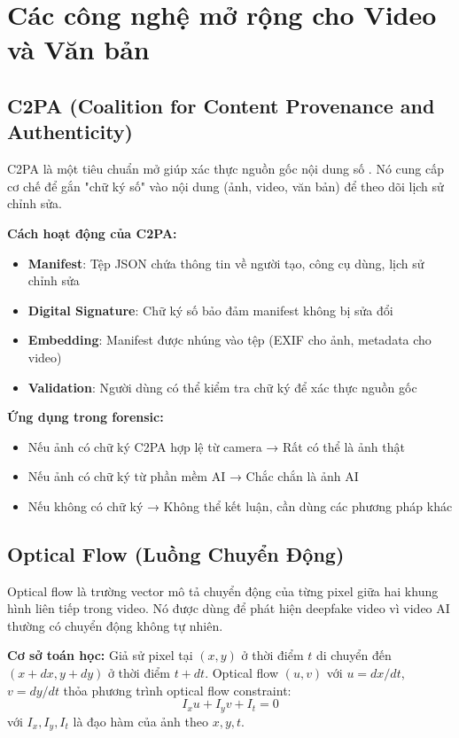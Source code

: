 \section{Các công nghệ mở rộng cho Video và Văn bản}

\subsection{C2PA (Coalition for Content Provenance and Authenticity)}
C2PA là một tiêu chuẩn mở giúp xác thực nguồn gốc nội dung số \cite{c2pa}. Nó cung cấp cơ chế để gắn "chữ ký số" vào nội dung (ảnh, video, văn bản) để theo dõi lịch sử chỉnh sửa.

\textbf{Cách hoạt động của C2PA:}
\begin{itemize}
  \item \textbf{Manifest}: Tệp JSON chứa thông tin về người tạo, công cụ dùng, lịch sử chỉnh sửa
  \item \textbf{Digital Signature}: Chữ ký số bảo đảm manifest không bị sửa đổi
  \item \textbf{Embedding}: Manifest được nhúng vào tệp (EXIF cho ảnh, metadata cho video)
  \item \textbf{Validation}: Người dùng có thể kiểm tra chữ ký để xác thực nguồn gốc
\end{itemize}

\textbf{Ứng dụng trong forensic:}
\begin{itemize}
  \item Nếu ảnh có chữ ký C2PA hợp lệ từ camera → Rất có thể là ảnh thật
  \item Nếu ảnh có chữ ký từ phần mềm AI → Chắc chắn là ảnh AI
  \item Nếu không có chữ ký → Không thể kết luận, cần dùng các phương pháp khác
\end{itemize}

\subsection{Optical Flow (Luồng Chuyển Động)}
Optical flow là trường vector mô tả chuyển động của từng pixel giữa hai khung hình liên tiếp trong video. Nó được dùng để phát hiện deepfake video vì video AI thường có chuyển động không tự nhiên.

\textbf{Cơ sở toán học:}
Giả sử pixel tại $(x,y)$ ở thời điểm $t$ di chuyển đến $(x+dx, y+dy)$ ở thời điểm $t+dt$. Optical flow $(u,v)$ với $u=dx/dt$, $v=dy/dt$ thỏa phương trình optical flow constraint:
\[
I_x u + I_y v + I_t = 0
\]
với $I_x, I_y, I_t$ là đạo hàm của ảnh theo $x, y, t$.

